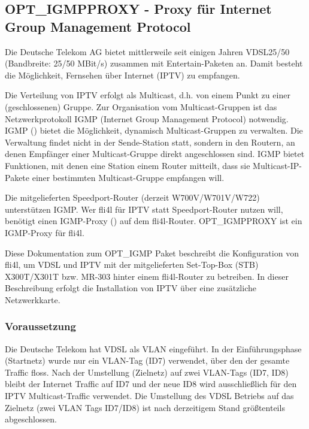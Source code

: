 \subsection{OPT\_IGMPPROXY - Proxy für Internet Group Management Protocol}

Die Deutsche Telekom AG bietet mittlerweile seit einigen Jahren VDSL25/50
(Bandbreite: 25/50 MBit/s) zusammen mit Entertain-Paketen an. Damit besteht die
Möglichkeit, Fernsehen über Internet (IPTV) zu empfangen.

Die Verteilung von IPTV erfolgt als Multicast, d.h. von einem Punkt zu einer
(geschlossenen) Gruppe. Zur Organisation vom Multicast-Gruppen ist das
Netzwerkprotokoll IGMP (Internet Group Management Protocol) notwendig. IGMP
() bietet die Möglichkeit, dynamisch
Multicast-Gruppen zu verwalten. Die Verwaltung findet nicht in der Sende-Station
statt, sondern in den Routern, an denen Empfänger einer Multicast-Gruppe direkt
angeschlossen sind. IGMP bietet Funktionen, mit denen eine Station einem Router
mitteilt, dass sie Multicast-IP-Pakete einer bestimmten Multicast-Gruppe
empfangen will.

Die mitgelieferten Speedport-Router (derzeit W700V/W701V/W722) unterstützen
IGMP. Wer fli4l für IPTV statt Speedport-Router nutzen will, benötigt einen
IGMP-Proxy () auf dem
fli4l-Router. OPT\_IGMPPROXY ist ein IGMP-Proxy für fli4l.

Diese Dokumentation zum OPT\_IGMP Paket beschreibt die Konfiguration von fli4l,
um VDSL und IPTV mit der mitgelieferten Set-Top-Box (STB) X300T/X301T bzw.
MR-303 hinter einem fli4l-Router zu betreiben. In dieser Beschreibung erfolgt
die Installation von IPTV über eine zusätzliche Netzwerkkarte.

\subsubsection{Voraussetzung}

Die Deutsche Telekom hat VDSL als VLAN eingeführt. In der Einführungsphase
(Startnetz) wurde nur ein VLAN-Tag (ID7) verwendet, über den der gesamte Traffic
floss. Nach der Umstellung (Zielnetz) auf zwei VLAN-Tags (ID7, ID8) bleibt der
Internet Traffic auf ID7 und der neue ID8 wird ausschließlich für den IPTV
Multicast-Traffic verwendet. Die Umstellung des VDSL Betriebs auf das Zielnetz
(zwei VLAN Tags ID7/ID8) ist nach derzeitigem Stand größtenteils abgeschlossen.


